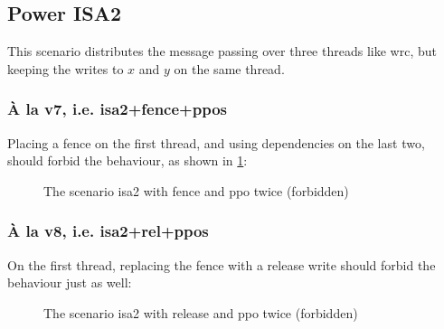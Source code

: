 \documentclass[a4paper]{article}
\begin{document}
\clearpage

\subsection{Power ISA2}

This scenario distributes the message passing over three threads like
\textsf{wrc}, but keeping the writes to $x$ and $y$ on the same thread.

\subsubsection{\`A la v7, i.e. \textsf{isa2+fence+ppos}}

Placing a fence on the first thread, and using dependencies on the last two,
should forbid the behaviour, as shown in \myfig\ref{fig:isa2}:

\begin{figure}[!h]
\begin{center}
\end{center}
\vspace*{-8mm}
\caption{The scenario \textsf{isa2} with fence and ppo twice (forbidden)\label{fig:isa2}}
\end{figure}


\subsubsection{\`A la v8, i.e. \textsf{isa2+rel+ppos}}

On the first thread, replacing the fence with a release write should forbid the
behaviour just as well:

\begin{figure}[!h]
\begin{center}
\end{center}
\vspace*{-8mm}
\caption{The scenario \textsf{isa2} with release and ppo twice (forbidden)\label{fig:isa2+rel+ppos}}
\end{figure}
\end{document}
